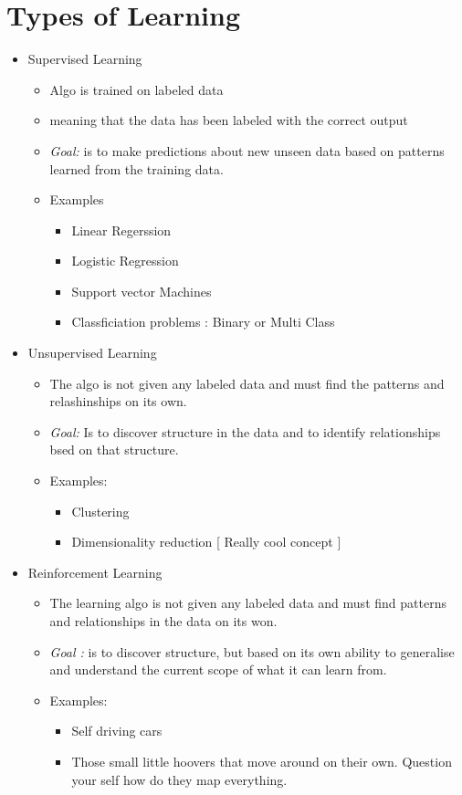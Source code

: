 \section{Types of Learning}
\begin{itemize}
	\item Supervised Learning
	      \begin{itemize}
		      \item Algo is trained on labeled data
		      \item meaning that the data has been labeled with the correct output
		      \item \textit{Goal: } is to make predictions about new unseen data based on patterns learned from the training data.
		      \item Examples
		            \begin{itemize}
			            \item Linear Regerssion
			            \item Logistic Regression
			            \item Support vector Machines
			            \item Classficiation problems : Binary or Multi Class
		            \end{itemize}
	      \end{itemize}
	\item Unsupervised Learning
	      \begin{itemize}
		      \item The algo is not given any labeled data and must find the patterns and relashinships on its own.
		      \item \textit{Goal: } Is to discover structure in the data and to identify relationships bsed on that structure.
		      \item Examples:
		            \begin{itemize}
			            \item Clustering
			            \item Dimensionality reduction [ Really cool concept ]
		            \end{itemize}
	      \end{itemize}
	\item Reinforcement Learning
	      \begin{itemize}
		      \item The learning algo is not given any labeled data and must find patterns and relationships in the data on its won.
		      \item \textit{Goal : } is to discover structure, but based on its own ability to generalise and understand the current scope of what it can learn from.
		      \item Examples:
		            \begin{itemize}
			            \item Self driving cars
			            \item Those small little hoovers that move around on their own. Question your self how do they map everything.
		            \end{itemize}
	      \end{itemize}

\end{itemize}

